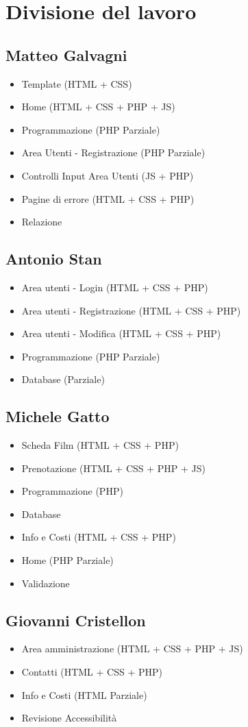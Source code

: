 \documentclass[a4paper, 12pt]{article}
\begin{document}
\section{Divisione del lavoro}
\subsection{Matteo Galvagni}
\begin{itemize}
    \item Template (HTML + CSS)
    \item Home (HTML + CSS + PHP + JS)
    \item Programmazione (PHP Parziale)
    \item Area Utenti - Registrazione (PHP Parziale)
    \item Controlli Input Area Utenti (JS + PHP)
    \item Pagine di errore (HTML + CSS + PHP)
    \item Relazione
\end{itemize}
\subsection{Antonio Stan}
\begin{itemize}
    \item Area utenti - Login (HTML + CSS + PHP)
    \item Area utenti - Registrazione (HTML + CSS + PHP)
    \item Area utenti - Modifica (HTML + CSS + PHP)
    \item Programmazione (PHP Parziale)
    \item Database (Parziale)
\end{itemize}
\subsection{Michele Gatto}
\begin{itemize}
    \item Scheda Film (HTML + CSS + PHP)
    \item Prenotazione (HTML + CSS + PHP + JS)
    \item Programmazione (PHP)
    \item Database
    \item Info e Costi (HTML + CSS + PHP)
    \item Home (PHP Parziale)
    \item Validazione
\end{itemize}
\subsection{Giovanni Cristellon}
\begin{itemize}
    \item Area amministrazione (HTML + CSS + PHP + JS)
    \item Contatti (HTML + CSS + PHP)
    \item Info e Costi (HTML Parziale)
    \item Revisione Accessibilità
\end{itemize}
\end{document}

